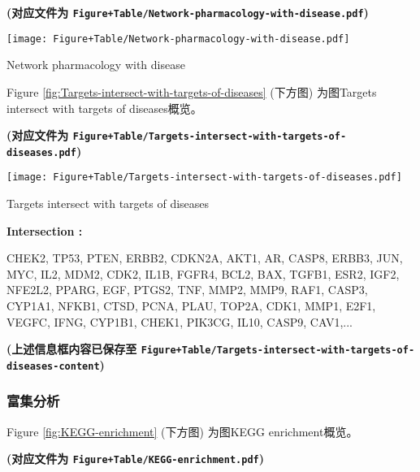 \documentclass[
]{article}
\begin{document}
\textbf{(对应文件为 \texttt{Figure+Table/Network-pharmacology-with-disease.pdf})}

\def\@captype{figure}
\begin{center}
\texttt{[image: Figure+Table/Network-pharmacology-with-disease.pdf]}
\caption{Network pharmacology with disease}\label{fig:Network-pharmacology-with-disease}
\end{center}

Figure \ref{fig:Targets-intersect-with-targets-of-diseases} (下方图) 为图Targets intersect with targets of diseases概览。

\textbf{(对应文件为 \texttt{Figure+Table/Targets-intersect-with-targets-of-diseases.pdf})}

\def\@captype{figure}
\begin{center}
\texttt{[image: Figure+Table/Targets-intersect-with-targets-of-diseases.pdf]}
\caption{Targets intersect with targets of diseases}\label{fig:Targets-intersect-with-targets-of-diseases}
\end{center}
\begin{center}\begin{tcolorbox}[colback=gray!10, colframe=gray!50, width=0.9\linewidth, arc=1mm, boxrule=0.5pt]
\textbf{
Intersection
:}

\vspace{0.5em}

    CHEK2, TP53, PTEN, ERBB2, CDKN2A, AKT1, AR, CASP8,
ERBB3, JUN, MYC, IL2, MDM2, CDK2, IL1B, FGFR4, BCL2, BAX,
TGFB1, ESR2, IGF2, NFE2L2, PPARG, EGF, PTGS2, TNF, MMP2,
MMP9, RAF1, CASP3, CYP1A1, NFKB1, CTSD, PCNA, PLAU, TOP2A,
CDK1, MMP1, E2F1, VEGFC, IFNG, CYP1B1, CHEK1, PIK3CG, IL10,
CASP9, CAV1,...

\vspace{2em}
\end{tcolorbox}
\end{center}

\textbf{(上述信息框内容已保存至 \texttt{Figure+Table/Targets-intersect-with-targets-of-diseases-content})}

\hypertarget{ux5bccux96c6ux5206ux6790}{%
\subsubsection{富集分析}\label{ux5bccux96c6ux5206ux6790}}

Figure \ref{fig:KEGG-enrichment} (下方图) 为图KEGG enrichment概览。

\textbf{(对应文件为 \texttt{Figure+Table/KEGG-enrichment.pdf})}
\end{document}
